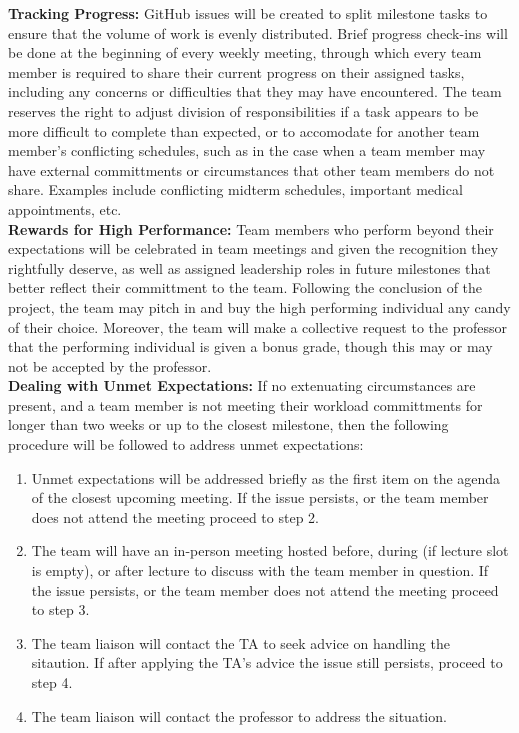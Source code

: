 \documentclass{article}
\begin{document}
\noindent\textbf{Tracking Progress:} GitHub issues will be created to split milestone tasks to ensure that the volume of work is evenly distributed. Brief progress check-ins will be done at the beginning of every weekly meeting, through which every 
team member is required to share their current progress on their assigned tasks, including any concerns or difficulties that they may have encountered. The team reserves the right to adjust division of responsibilities if a task appears to be
more difficult to complete than expected, or to accomodate for another team member's conflicting schedules, such as in the case when a team member may have external committments or circumstances that other team members do not share. Examples include
conflicting midterm schedules, important medical appointments, etc. \\

\noindent\textbf{Rewards for High Performance:} Team members who perform beyond their expectations will be celebrated in team meetings and given the recognition they rightfully deserve, as well as assigned leadership roles in future milestones that better reflect their
committment to the team. Following the conclusion of the project, the team may pitch in and buy the high performing individual any candy of their choice. Moreover, the team will make a collective request to the professor that the performing individual is given a bonus grade,
though this may or may not be accepted by the professor. \\

\noindent\textbf{Dealing with Unmet Expectations:}
If no extenuating circumstances are present, and a team member is not meeting their workload committments for longer than two weeks or up to the closest milestone, then the following procedure will be followed to address unmet expectations: \\

\begin{enumerate}
  \item Unmet expectations will be addressed briefly as the first item on the agenda of the closest upcoming meeting. If the issue persists, or the team member does not attend the meeting
  proceed to step 2.
  \item The team will have an in-person meeting hosted before, during (if lecture slot is empty), or after lecture to discuss with the team member in question. If the issue persists, or the team member does not attend the meeting
  proceed to step 3.
  \item The team liaison will contact the TA to seek advice on handling the sitaution. If after applying the TA's advice the issue still persists, proceed to step 4.
  \item The team liaison will contact the professor to address the situation.
\end{enumerate}
\end{document}
